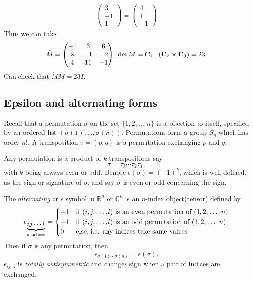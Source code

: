 \documentclass[10pt]{article}
\begin{document}
\begin{example}
\[\begin{aligned}
\begin{pmatrix}
                3 \\
                -1 \\
                1
                \end{pmatrix}=\begin{pmatrix}
                4 \\
                11\\
                -1
                \end{pmatrix}
                \end{aligned}
        \]
        Thus we can take 
        \[
            \tilde{M}=\begin{pmatrix}
                -1&3&6\\
                8&-1&-2\\
                4&11&-1
            \end{pmatrix}, \det M = {\bf C}_1 \cdot ({\bf C}_2 \times {\bf C}_3 )=23
        .\]
        Can check that $ \tilde{M}M=23I $.
    \end{example}
    \subsection{Epsilon and alternating forms}
    Recall that a permutation $ \sigma $ on the set $\{1,2,\dots,n\}$ is a bijection to itself, specified by an ordered list $ (\sigma(1),\dots,\sigma(n)) $. Permutations form a group $ S_n $ which has order $ n! $. A transposition $ \tau=(p,q) $ is a permutation exchanging $p$ and $q$.

    Any permutation is a product of $k$ transpositions say 
    \[
        \sigma=\tau_k \cdots \tau_2 \tau_1
    ,\]
    with $k$ being always even or odd. Denote $ \epsilon(\sigma)=(-1)^k $, which is well defined, as the sign or signature of $ \sigma $, and say $ \sigma $ is even or odd concerning the sign. 

    The \textit{alternating} or $ \epsilon $ symbol in $ \mathbb{R}^{n} $ or $ \mathbb{C}^{n} $ is an $n$-index object(tensor) defined by 
    \[
        \epsilon_{\underbrace{ij\cdots l}_{n\text{ indices}}}=\begin{cases}
        +1 &\text{if $ (i,j,\dots,l) $ is an even permutation of $ (1,2,\dots,n) $}\\
        -1 &\text{if $ (i,j,\dots,l) $ is an odd permutation of $ (1,2,\dots,n) $}\\
        0 &\text{else, i.e. any indices take same values}
        \end{cases} 
    \]
    Then if $ \sigma $ is any permutation, then
    \[
        \epsilon_{\sigma(1)\cdots \sigma(n)}=\epsilon(\sigma)
    .\]
    $ \epsilon_{ij\cdots l} $ is \textit{totally antisymmetric} and changes sign when a pair of indices are exchanged.
\end{document}
